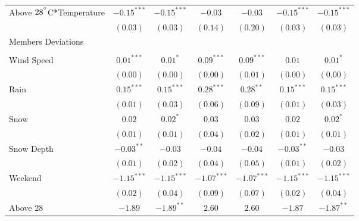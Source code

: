 \documentclass[12pt,letter paper]{article}
\begin{document}
\begin{table}[H]
\begin{center}
\begin{tabular}{l c c c c c c }
\quad Above $28^{\degree}$C*Temperature                     & $-0.15^{***}$ & $-0.15^{***}$ & $-0.03$       & $-0.03$       & $-0.15^{***}$ & $-0.15^{***}$ \\
                                           & $(0.03)$      & $(0.03)$      & $(0.14)$      & $(0.20)$      & $(0.03)$      & $(0.03)$      \\
Members Deviations                             &               &               &               &               &               &               \\
                                           &               &               &               &               &               &               \\
\quad Wind Speed           & $0.01^{***}$  & $0.01^{*}$    & $0.09^{***}$  & $0.09^{***}$  & $0.01$        & $0.01^{*}$    \\
                                           & $(0.00)$      & $(0.00)$      & $(0.00)$      & $(0.01)$      & $(0.00)$      & $(0.00)$      \\
\quad Rain      & $0.15^{***}$  & $0.15^{***}$  & $0.28^{***}$  & $0.28^{**}$   & $0.15^{***}$  & $0.15^{***}$  \\
                                           & $(0.01)$      & $(0.03)$      & $(0.06)$      & $(0.09)$      & $(0.01)$      & $(0.03)$      \\
\quad Snow           & $0.02$        & $0.02^{*}$    & $0.03$        & $0.03$        & $0.02$        & $0.02^{*}$    \\
                                           & $(0.01)$      & $(0.01)$      & $(0.04)$      & $(0.02)$      & $(0.01)$      & $(0.01)$      \\
\quad Snow Depth   & $-0.03^{**}$  & $-0.03$       & $-0.04$       & $-0.04$       & $-0.03^{**}$  & $-0.03$       \\
                                           & $(0.01)$      & $(0.02)$      & $(0.04)$      & $(0.05)$      & $(0.01)$      & $(0.02)$      \\
\quad Weekend         & $-1.15^{***}$ & $-1.15^{***}$ & $-1.07^{***}$ & $-1.07^{***}$ & $-1.15^{***}$ & $-1.15^{***}$ \\
                                           & $(0.02)$      & $(0.04)$      & $(0.09)$      & $(0.07)$      & $(0.02)$      & $(0.04)$      \\
\quad Above 28      & $-1.89$       & $-1.89^{**}$  & $2.60$        & $2.60$        & $-1.87$       & $-1.87^{**}$  \\

\end{tabular}
\end{center}
\end{table}
\end{document}

